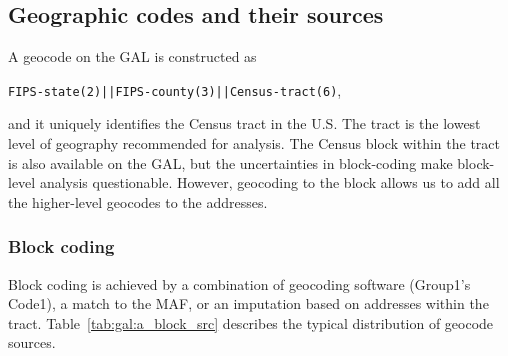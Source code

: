 % 
% 
% 
% 
% 
% 
% 
\subsection{Geographic codes and their sources}

A geocode on the GAL  is constructed as 
\begin{center}
  {\tt FIPS-state(2)||FIPS-county(3)||Census-tract(6)}, 
\end{center}
and it uniquely identifies the
Census tract in the U.S. The tract is the lowest level of geography recommended for analysis. The Census
block within the tract is also available on the GAL, but the uncertainties in block-coding make block-level analysis
questionable. However, geocoding to the block allows us to add all the higher-level geocodes to the
addresses. 


\subsubsection{Block coding}


Block coding is achieved by a combination of geocoding software (Group1's
Code1), a match to the MAF, or an imputation based on addresses within the
tract. Table~\ref{tab:gal:a_block_src} describes the typical
distribution of geocode sources.

